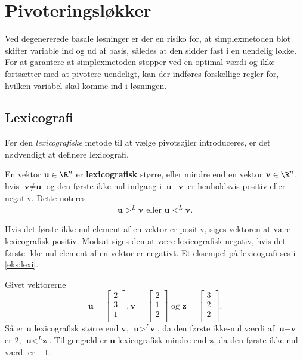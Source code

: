 \section{Pivoteringsløkker}
Ved degenererede basale løsninger er der en risiko for, at simplexmetoden blot skifter variable ind og ud af basis, således at den sidder fast i en uendelig løkke.  
For at garantere at simplexmetoden stopper ved en optimal værdi og ikke fortsætter med at pivotere uendeligt, kan der indføres forskellige regler for, hvilken variabel skal komme ind i løsningen.

\subsection{Lexicografi}
%
Før den \textit{lexicografiske} metode til at vælge pivotsøjler introduceres, er det nødvendigt at definere lexicografi.
\begin{defn}{}{}
En vektor $\textbf{u}\in \R^n$ er \textbf{lexicografisk} større, eller mindre end en vektor $\textbf{v}\in \R^n$, hvis $\textbf{v} \neq \textbf{u}$ og den første ikke-nul indgang i $\textbf{u}-\textbf{v}$ er henholdsvis positiv eller negativ. Dette noteres
\begin{align*}
\textbf{u} >^L \textbf{v} \text{ eller } \textbf{u} <^L \textbf{v}.
\end{align*} 
\end{defn}
\noindent
Hvis det første ikke-nul element af en vektor er positiv, siges vektoren at være lexicografisk positiv. Modsat siges den at være lexicografisk negativ, hvis det første ikke-nul element af en vektor er negativt. Et eksempel på lexicografi ses i \ref{eks:lexi}.
\\
%
\begin{eks}\label{eks:lexi}
Givet vektorerne
$$\textbf{u}=
\begin{bmatrix}
2\\
3\\
1\\
\end{bmatrix}
,
\textbf{v}=
\begin{bmatrix}
2\\
1\\
2\\
\end{bmatrix}
\text{ og }
\textbf{z}=
\begin{bmatrix}
3\\
2\\
2\\
\end{bmatrix}
.$$
Så er $\textbf{u}$  lexicografisk større end $\textbf{v}$, $\textbf{u} >^L \textbf{v}$, da den første ikke-nul værdi af $\textbf{u}-\textbf{v}$ er $2$, $\textbf{u} <^L \textbf{z}$.
Til gengæld er $\textbf{u}$ lexicografisk mindre end $\textbf{z}$, da den første ikke-nul værdi er $-1$.
\end{eks}

